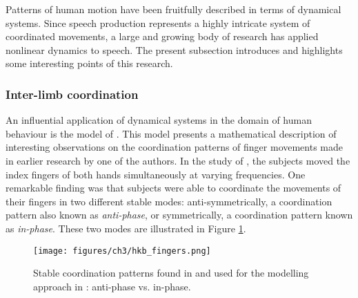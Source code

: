 Patterns of human motion have been fruitfully described in terms of dynamical systems. Since speech production represents a highly intricate system of coordinated movements, a large and growing body of research has applied nonlinear dynamics to speech. The present subsection introduces and highlights some interesting points of this research.

\subsubsection{Inter-limb coordination}

An influential application of dynamical systems in the domain of human behaviour is the model of \citet{HakenKelsoBunz1985}. This model presents a mathematical description of interesting observations on the coordination patterns of finger movements made in earlier research by one of the authors. In the study of \citet{Kelso1981}, the subjects moved the index fingers of both hands simultaneously at varying frequencies. One remarkable finding was that subjects were able to coordinate the movements of their fingers in two different stable modes: anti-symmetrically, a coordination pattern also known as \emph{anti-phase}, or symmetrically, a coordination pattern known as \emph{in-phase}. These two modes are illustrated in Figure \ref{fig:hkb_fingers}.

\begin{figure}
\texttt{[image: figures/ch3/hkb\_fingers.png]}
\caption[Stable coordination patterns found in \citet{Kelso1981}.]{Stable coordination patterns found in \citet{Kelso1981} and used for the modelling approach in \citet{HakenKelsoBunz1985}: anti-phase vs. in-phase.}
\label{fig:hkb_fingers}
\end{figure}

